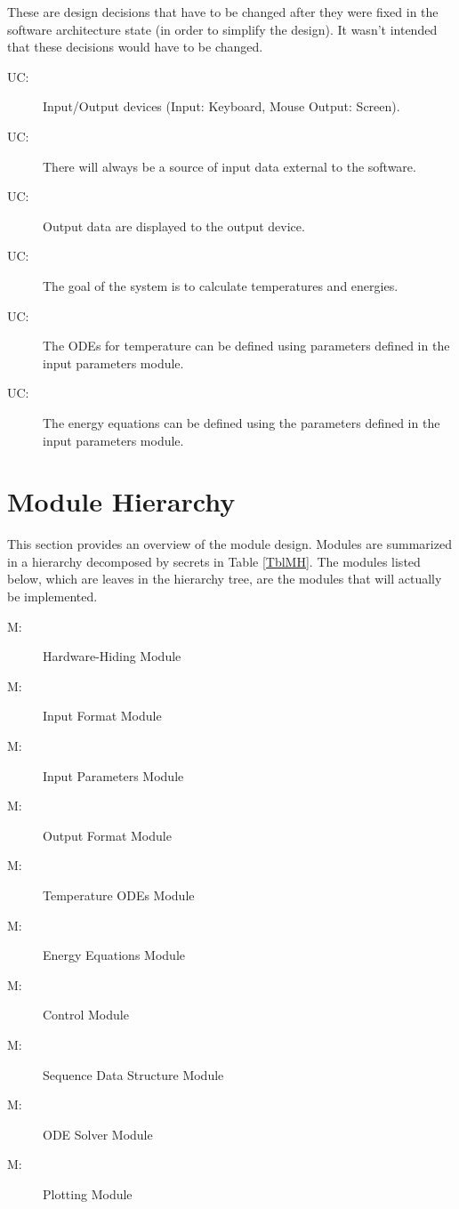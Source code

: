 \documentclass[12pt]{article}
\newcounter{ucnum}
\newcommand{\uctheucnum}{UC\theucnum}
\newcounter{mnum}
\newcommand{\mthemnum}{M\themnum}
\begin{document}
These are design decisions that have to be changed after they were fixed in the software architecture state (in order to simplify the design). It wasn't intended that these decisions would have to be changed.

\begin{description}
\item[ \uctheucnum \label{ucIO}:] Input/Output devices
  (Input: Keyboard, Mouse Output: Screen).
\item[ \uctheucnum \label{ucInput}:] There will always be
  a source of input data external to the software.
\item[ \uctheucnum \label{ucOutput}:] Output data are
  displayed to the output device.
\item[ \uctheucnum \label{ucGoal}:] The goal of the system
  is to calculate temperatures and energies.
\item[ \uctheucnum \label{ucODEstructure}:] The ODEs for
  temperature can be defined using parameters defined in the input parameters module.
\item[ \uctheucnum \label{ucEnergyStructure}:] The energy
  equations can be defined using the parameters defined in the input parameters module.
\end{description}

\section{Module Hierarchy} \label{SecMH}

This section provides an overview of the module design. Modules are summarized
in a hierarchy decomposed by secrets in Table \ref{TblMH}. The modules listed
below, which are leaves in the hierarchy tree, are the modules that will
actually be implemented.

\begin{description}
\item [ \mthemnum \label{mHH}:] Hardware-Hiding Module
\item [ \mthemnum \label{mInput}:] Input Format Module
\item [ \mthemnum \label{mParams}:] Input Parameters Module
\item [ \mthemnum \label{mOutput}:] Output Format Module
\item [ \mthemnum \label{mODEs}:] Temperature ODEs Module
\item [ \mthemnum \label{mEnergy}:] Energy Equations Module
\item [ \mthemnum \label{mControl}:] Control Module
\item [ \mthemnum \label{mSeqDS}:] Sequence Data Structure Module
\item [ \mthemnum \label{mSolver}:] ODE Solver Module
\item [ \mthemnum \label{mPlot}:] Plotting Module
\end{description}
\end{document}
